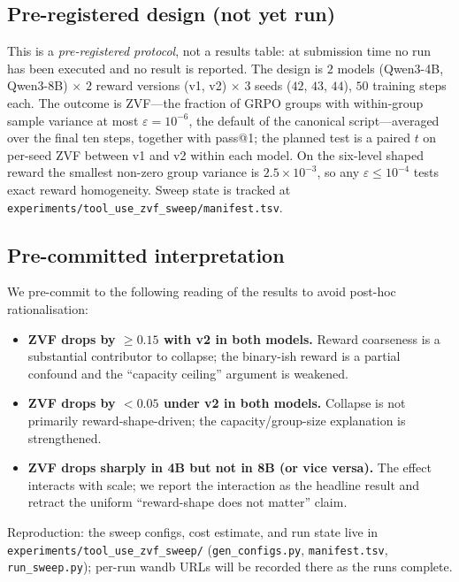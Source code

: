 \subsection{Pre-registered design (not yet run)}
This is a \emph{pre-registered protocol}, not a results table: at submission time
no run has been executed and no result is reported. The design is
$2$ models (Qwen3-4B, Qwen3-8B) $\times$ $2$ reward versions (v1, v2) $\times$ $3$
seeds ($42$, $43$, $44$), $50$ training steps each. The outcome is ZVF---the
fraction of GRPO groups with within-group sample variance at most
$\varepsilon=10^{-6}$, the default of the canonical script---averaged over the
final ten steps, together with pass@1; the planned test is a paired $t$ on
per-seed ZVF between v1 and v2 within each model. On the six-level shaped reward
the smallest non-zero group variance is $2.5\times10^{-3}$, so any
$\varepsilon\le10^{-4}$ tests exact reward homogeneity. Sweep state is tracked at
\texttt{experiments/tool\_use\_zvf\_sweep/manifest.tsv}.
\label{tab:zvf-counterfactual}

\subsection{Pre-committed interpretation}
We pre-commit to the following reading of the results to avoid post-hoc
rationalisation:
\begin{itemize}
  \item \textbf{ZVF drops by \(\geq 0.15\) with v2 in both models.}
        Reward coarseness is a substantial contributor to collapse;
        the binary-ish reward is a partial confound and the
        ``capacity ceiling'' argument is weakened.
  \item \textbf{ZVF drops by \(<0.05\) under v2 in both models.}
        Collapse is not primarily reward-shape-driven; the
        capacity/group-size explanation is strengthened.
  \item \textbf{ZVF drops sharply in 4B but not in 8B (or vice versa).}
        The effect interacts with scale; we report the interaction as
        the headline result and retract the uniform ``reward-shape does
        not matter'' claim.
\end{itemize}

Reproduction: the sweep configs, cost estimate, and run state live in
\texttt{experiments/tool\_use\_zvf\_sweep/} (\texttt{gen\_configs.py},
\texttt{manifest.tsv}, \texttt{run\_sweep.py}); per-run wandb URLs will be
recorded there as the runs complete.
